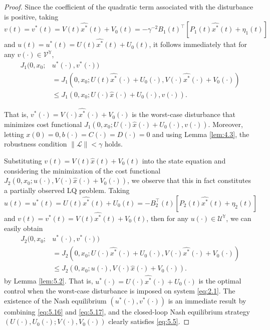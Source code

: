\documentclass[lettersize,journal]{IEEEtran}
\theoremstyle{plain}
\theoremstyle{definition}
\begin{document}
\begin{proof}
	Since the coefficient of the quadratic term associated with the disturbance is positive, taking $v(t) = v^*(t) = V(t)\widehat{x^*}(t) + V_0(t) = -\gamma^{-2}B_1(t)^{\top}[P_1(t)\widehat{x^*}(t) + \eta_1(t)]$ and $u(t) = u^*(t) = U(t)\widehat{x^*}(t) + U_0(t)$, it follows immediately that for any $v(\cdot) \in \mathcal{V}^{\mathbb{Y}}$,
	\begin{equation}\label{eq:5.16}
		\begin{aligned}
			J_1(0,x_0;&u^*(\cdot),v^*(\cdot)) \\
			&= J_1(0,x_0;U(t)\widehat{x^*}(\cdot) + U_0(\cdot),V(\cdot)\widehat{x^*}(\cdot) + V_0(\cdot))\\
			&\leq J_1(0,x_0;U(\cdot)\widehat{x}(\cdot) + U_0(\cdot),v(\cdot)).
		\end{aligned}
	\end{equation}
	
	That is, $v^*(\cdot) = V(\cdot)\widehat{x^*}(\cdot) + V_0(\cdot)$ is the worst-case disturbance that minimizes cost functional $J_1(0,x_0;U(\cdot)\widehat{x}(\cdot) + U_0(\cdot),v(\cdot))$. Moreover, letting $x(0) = 0, b(\cdot) = C(\cdot) = D(\cdot) = 0$ and using Lemma \ref{lem:4.3}, the robustness condition $\|\mathcal{L}\| < \gamma$ holds.
	
	Substituting $v(t) = V(t)\widehat{x}(t) + V_0(t)$ into the state equation and considering the minimization of the cost functional $J_2(0,x_0;u(\cdot),V(\cdot)\widehat{x}(\cdot) + V_0(\cdot))$, we observe that this in fact constitutes a partially observed LQ problem. Taking $u(t) = u^*(t) = U(t)\widehat{x^*}(t) + U_0(t) = -B_2^{\top}(t)[P_2(t)\widehat{x^*}(t) + \eta_2(t)]$ and $v(t) = v^*(t) = V(t)\widehat{x^*}(t) + V_0(t)$, then for any $u(\cdot) \in \mathcal{U}^{\mathbb{Y}}$, we can easily obtain 
	\begin{equation}\label{eq:5.17}
		\begin{aligned}
			J_2(0,x_0;&u^*(\cdot),v^*(\cdot)) \\
			&= J_2(0,x_0;U(\cdot)\widehat{x^*}(\cdot) + U_0(\cdot),V(\cdot)\widehat{x^*}(\cdot) + V_0(\cdot))\\
			&\leq J_2(0,x_0;u(\cdot),V(\cdot)\widehat{x}(\cdot) + V_0(\cdot)).
		\end{aligned}
	\end{equation}
	by Lemma \ref{lem:5.2}. That is, $u^*(\cdot) = U(\cdot)\widehat{x^*}(\cdot) + U_0(\cdot)$ is the optimal control when the worst-case disturbance is imposed on system \eqref{eq:2.1}. The existence of the Nash equilibrium $(u^*(\cdot), v^*(\cdot))$ is an immediate result by combining \eqref{eq:5.16} and \eqref{eq:5.17}, and the closed-loop Nash equilibrium strategy $(U(\cdot),U_0(\cdot);V(\cdot),V_0(\cdot))$ clearly satisfies \eqref{eq:5.5}.
\end{proof}
\end{document}
